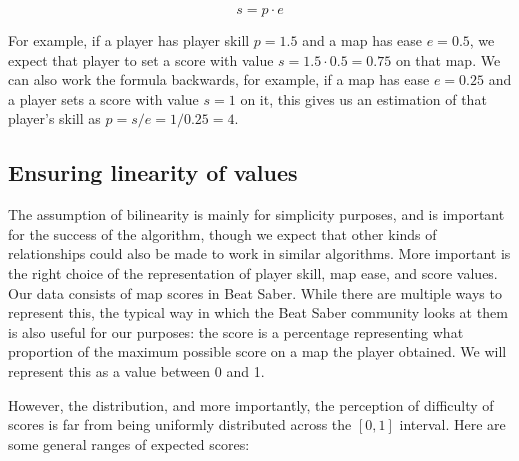 \documentclass[12pt,a4paper]{article}
\begin{document}
\begin{equation}
\label{bilinear_relation}
s = p \cdot e
\end{equation}

For example, if a player has player skill $p = 1.5$ and a map has ease $e = 0.5$, we expect that player to set a score with value $s = 1.5 \cdot 0.5 = 0.75$ on that map. We can also work the formula backwards, for example, if a map has ease $e = 0.25$ and a player sets a score with value $s = 1$ on it, this gives us an estimation of that player's skill as $p = s / e = 1 / 0.25 = 4$.\\

\subsection{Ensuring linearity of values}
\label{ensuring_linearity}

The assumption of bilinearity is mainly for simplicity purposes, and is important for the success of the algorithm, though we expect that other kinds of relationships could also be made to work in similar algorithms. More important is the right choice of the representation of player skill, map ease, and score values. Our data consists of map scores in Beat Saber. While there are multiple ways to represent this, the typical way in which the Beat Saber community looks at them is also useful for our purposes: the score is a percentage representing what proportion of the maximum possible score on a map the player obtained. We will represent this as a value between 0 and 1. 

However, the distribution, and more importantly, the perception of difficulty of scores is far from being uniformly distributed across the $[0,1]$ interval. Here are some general ranges of expected scores:
\end{document}
